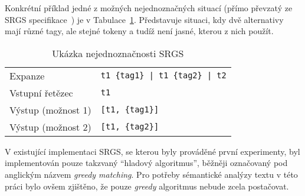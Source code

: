 Konkrétní příklad jedné z možných nejednoznačných situací (přímo převzatý ze SRGS specifikace~\cite{srgs}) je v Tabulace~\ref{tab:ambiguity_example}.
Představuje situaci, kdy dvě alternativy mají různé tagy, ale stejné tokeny a tudíž není jasné, kterou z nich použít.
\begin{table}[ht!]
	\centering
	\begin{tabular}{|l|l|}
		\hline
		Expanze            & \texttt{t1 \{tag1\} | t1 \{tag2\} | t2} \\
		Vstupní řetězec    & \texttt{t1}                             \\
		Výstup (možnost 1) & \texttt{[{t1}, \{tag1\}]}               \\
		Výstup (možnost 2) & \texttt{[{t1}, \{tag2\}]}               \\
		\hline
	\end{tabular}
	\caption{Ukázka nejednoznačnosti SRGS}\label{tab:ambiguity_example}
\end{table}

V existující implementaci SRGS, se kterou byly prováděné první experimenty, byl implementován pouze takzvaný \enquote{hladový algoritmus}, běžněji označovaný pod anglickým názvem \emph{greedy matching}.
Pro potřeby sémantické analýzy textu v této práci bylo ovšem zjištěno, že pouze \emph{greedy} algoritmus nebude zcela postačovat.

